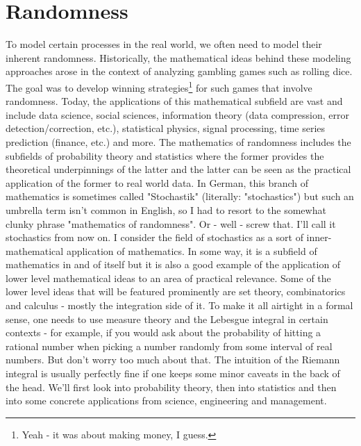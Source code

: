 \chapter{Randomness}
To model certain processes in the real world, we often need to model their inherent randomness. Historically, the mathematical ideas behind these modeling approaches arose in the context of analyzing gambling games such as rolling dice. The goal was to develop winning strategies\footnote{Yeah - it was about making money, I guess.} for such games that involve randomness. Today, the applications of this mathematical subfield are vast and include data science, social sciences, information theory (data compression, error detection/correction, etc.), statistical physics, signal processing, time series prediction (finance, etc.) and more. The mathematics of randomness includes the subfields of probability theory and statistics where the former provides the theoretical underpinnings of the latter and the latter can be seen as the practical application of the former to real world data. In German, this branch of mathematics is sometimes called "Stochastik" (literally: "stochastics") but such an umbrella term isn't common in English, so I had to resort to the somewhat clunky phrase "mathematics of randomness". Or - well - screw that. I'll call it stochastics from now on. I consider the field of stochastics as a sort of inner-mathematical application of mathematics. In some way, it is a subfield of mathematics in and of itself but it is also a good example of the application of lower level mathematical ideas to an area of practical relevance. Some of the lower level ideas that will be featured prominently are set theory, combinatorics and calculus - mostly the integration side of it. To make it all airtight in a formal sense, one needs to use measure theory and the Lebesgue integral in certain contexts - for example, if you would ask about the probability of hitting a rational number when picking a number randomly from some interval of real numbers. But don't worry too much about that. The intuition of the Riemann integral is usually perfectly fine if one keeps some minor caveats in the back of the head. We'll first look into probability theory, then into statistics and then into some concrete applications from science, engineering and management.



